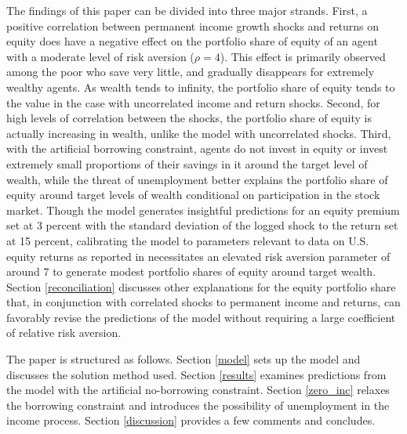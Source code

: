 The findings of this paper can be divided into three major strands. First, a positive correlation between permanent income growth shocks and returns on equity does have a negative effect on the portfolio share of equity of an agent with a moderate level of risk aversion ($\rho = 4$). This effect is primarily observed among the poor who save very little, and gradually disappears for extremely wealthy agents. As wealth tends to infinity, the portfolio share of equity tends to the value in the case with uncorrelated income and return shocks. Second, for high levels of correlation between the shocks, the portfolio share of equity is actually increasing in wealth, unlike the model with uncorrelated shocks. Third, with the artificial borrowing constraint, agents do not invest in equity or invest extremely small proportions of their savings in it around the target level of wealth, while the threat of unemployment better explains the portfolio share of equity around target levels of wealth conditional on participation in the stock market. Though the model generates insightful predictions for an equity premium set at 3 percent with the standard deviation of the logged shock to the return set at 15 percent, calibrating the model to parameters relevant to data on U.S. equity returns as reported in \citet{Mehra2006} necessitates an elevated risk aversion parameter of around 7 to generate modest portfolio shares of equity around target wealth. Section \ref{reconciliation} discusses other explanations for the equity portfolio share that, in conjunction with correlated shocks to permanent income and returns, can favorably revise the predictions of the model without requiring a large coefficient of relative risk aversion.

The paper is structured as follows. Section \ref{model} sets up the model and discusses the solution method used. Section \ref{results} examines predictions from the model with the artificial no-borrowing constraint. Section \ref{zero_inc} relaxes the borrowing constraint and introduces the possibility of unemployment in the income process. Section \ref{discussion} provides a few comments and concludes.